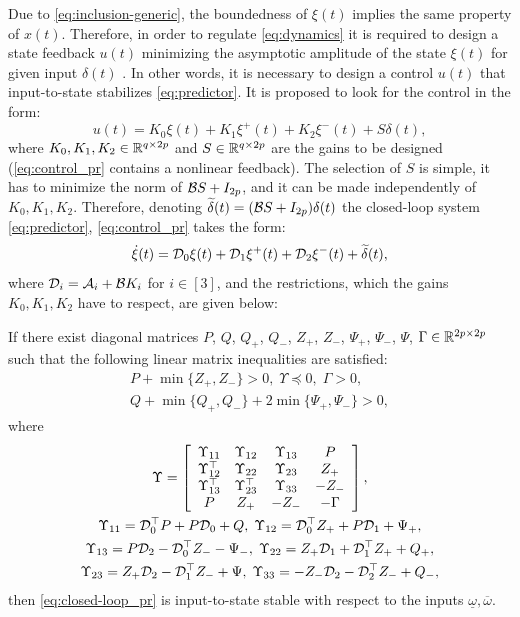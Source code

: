 \documentclass[letterpaper, 10 pt, conference]{ieeeconf}  %
\begin{document}
Due to \eqref{eq:inclusion-generic}, the boundedness of $\xi(t)$
implies the same property of $x(t)$. Therefore, in order to regulate
\eqref{eq:dynamics} it is required to design a state feedback $u(t)$
minimizing the asymptotic amplitude of the state $\xi(t)$ for given
input $\delta(t)$ \cite{Efimov2013a}. In other words, it is necessary
to design a control $u(t)$ that input-to-state stabilizes \eqref{eq:predictor}.
It is proposed to look for the control in the form:
\begin{equation}
u(t)=K_{0}\xi(t)+K_{1}\xi^{+}(t)+K_{2}\xi^{-}(t)+S\delta(t),\label{eq:control_pr}
\end{equation}
where $K_{0},K_{1},K_{2}\in\mathbb{R}^{q\times2p}$ and $S\in\mathbb{R}^{q\times2p}$
are the gains to be designed (\eqref{eq:control_pr} contains a nonlinear
feedback). The selection of $S$ is simple, it has to minimize the
norm of $\mathcal{B} S+I_{2p}$, and it can be made independently of $K_{0},K_{1},K_{2}$.
Therefore, denoting $\widetilde{\delta}(t)=(\mathcal{B} S+I_{2p})\delta(t)$ the
closed-loop system \eqref{eq:predictor}, \eqref{eq:control_pr} takes
the form:
\begin{equation}
\dot{\xi}(t)=\mathcal{D}_{0}\xi(t)+\mathcal{D}_{1}\xi^{+}(t)+\mathcal{D}_{2}\xi^{-}(t)+\widetilde{\delta}(t),\label{eq:closed-loop_pr}
\end{equation}
where $\mathcal{D}_{i}=\mathcal{A}_{i}+\mathcal{B} K_{i}$ for $i\in[3]$, and the restrictions,
which the gains $K_{0},K_{1},K_{2}$ have to respect, are given below:
\begin{theorem}
\label{thm:ISS_pr} If there exist diagonal matrices $P$, $Q$, $Q_{+}$,
$Q_{-}$, $Z_{+}$, $Z_{-}$, $\Psi_{+}$, $\Psi_{-}$, $\Psi$, $\Gamma\in\mathbb{R}^{2p\times2p}$
such that the following linear matrix inequalities are satisfied:
\begin{gather*}
P+\min\{Z_{+},Z_{-}\}>0,\;\Upsilon\preceq0,\;\Gamma>0,\\
Q+\min\{Q_{+},Q_{-}\}+2\min\{\Psi_{+},\Psi_{-}\}>0,
\end{gather*}
where
\begin{gather*}
\Upsilon=\left[\begin{array}{cccc}
\Upsilon_{11} & \Upsilon_{12} & \Upsilon_{13} & P\\
\Upsilon_{12}^{\top} & \Upsilon_{22} & \Upsilon_{23} & Z_{+}\\
\Upsilon_{13}^{\top} & \Upsilon_{23}^{\top} & \Upsilon_{33} & -Z_{-}\\
P & Z_{+} & -Z_{-} & -\Gamma
\end{array}\right],\\
\Upsilon_{11}=\mathcal{D}_{0}^{\top}P+P\mathcal{D}_{0}+Q,\;\Upsilon_{12}=\mathcal{D}_{0}^{\top}Z_{+}+P\mathcal{D}_{1}+\Psi_{+},\\
\Upsilon_{13}=P\mathcal{D}_{2}-\mathcal{D}_{0}^{\top}Z_{-}-\Psi_{-},\;\Upsilon_{22}=Z_{+}\mathcal{D}_{1}+\mathcal{D}_{1}^{\top}Z_{+}+Q_{+},\\
\Upsilon_{23}=Z_{+}\mathcal{D}_{2}-\mathcal{D}_{1}^{\top}Z_{-}+\Psi,\;\Upsilon_{33}=-Z_{-}\mathcal{D}_{2}-\mathcal{D}_{2}^{\top}Z_{-}+Q_{-},
\end{gather*}
then \eqref{eq:closed-loop_pr} is input-to-state stable with respect
to the inputs $\underline{\omega},\overline{\omega}$.
\end{theorem}
\end{document}
